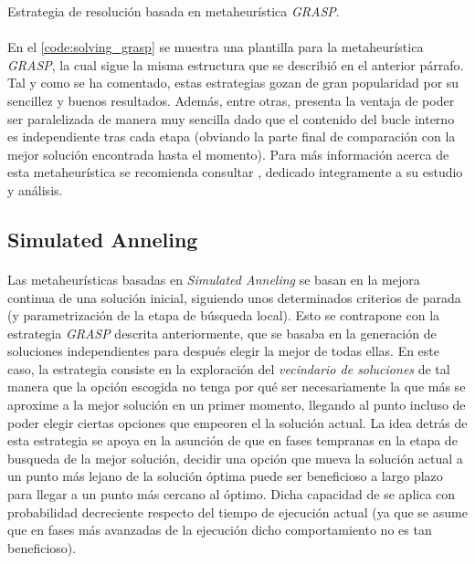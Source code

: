 \documentclass{subfiles}
\begin{document}
      \begin{algorithm}[ht]
        \SetAlgoLined
        \caption{Estrategia de resolución basada en metaheurística \emph{GRASP}.}
        \label{code:solving_grasp}
      \end{algorithm}

      \paragraph{}
      En el \cref{code:solving_grasp} se muestra una plantilla para la metaheurística \emph{GRASP}, la cual sigue la misma estructura que se describió en el anterior párrafo. Tal y como se ha comentado, estas estrategias gozan de gran popularidad por su sencillez y buenos resultados. Además, entre otras, presenta la ventaja de poder ser paralelizada de manera muy sencilla dado que el contenido del bucle interno es independiente tras cada etapa (obviando la parte final de comparación con la mejor solución encontrada hasta el momento). Para más información acerca de esta metaheurística se recomienda consultar \cite{resende2016optimization}, dedicado integramente a su estudio y análisis.

      \subsection{Simulated Anneling}
      \label{sec:solving_simulated_anneling}

        \paragraph{}
        Las metaheurísticas basadas en \emph{Simulated Anneling} se basan en la mejora continua de una solución inicial, siguiendo unos determinados criterios de parada (y parametrización de la etapa de búsqueda local). Esto se contrapone con la estrategia \emph{GRASP} descrita anteriormente, que se basaba en la generación de soluciones independientes para después elegir la mejor de todas ellas. En este caso, la estrategia consiste en la exploración del \emph{vecindario de soluciones} de tal manera que la opción escogida no tenga por qué ser necesariamente la que más se aproxime a la mejor solución en un primer momento, llegando al punto incluso de poder elegir ciertas opciones que empeoren el la solución actual. La idea detrás de esta estrategia se apoya en la asunción de que en fases tempranas en la etapa de busqueda de la mejor solución, decidir una opción que mueva la solución actual a un punto más lejano de la solución óptima puede ser beneficioso a largo plazo para llegar a un punto más cercano al óptimo. Dicha capacidad de  se aplica con probabilidad decreciente respecto del tiempo de ejecución actual (ya que se asume que en fases más avanzadas de la ejecución dicho comportamiento no es tan beneficioso).
\end{document}

